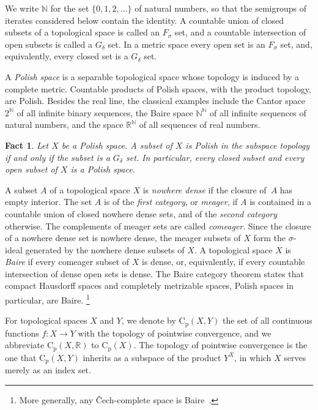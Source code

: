 \documentclass[psamsfonts]{amsart}
\newtheorem{fact}[thm]{Fact}
\theoremstyle{definition}
\theoremstyle{remark}
\newcommand{\Cp}{\mathrm{C}_{\mathrm{p}}}
\numberwithin{equation}{section}
\begin{document}
We write $\mathbb{N}$ for the set $\{0,1,2,\dots\}$ of natural numbers, so that the semigroups of iterates considered below contain the identity.
A countable union of closed subsets of a topological space is called an $F_\sigma$ set, and a countable intersection of open subsets is called a $G_\delta$ set.
In a metric space every open set is an $F_\sigma$ set, and, equivalently, every closed set is a $G_\delta$ set.

A \emph{Polish space} is a separable topological space whose topology is induced by a complete metric.
Countable products of Polish spaces, with the product topology, are Polish.
Besides the real line, the classical examples include the Cantor space~$2^\mathbb{N}$ of all infinite binary sequences, the Baire space $\mathbb{N}^\mathbb{N}$ of all infinite sequences of natural numbers, and the space $\mathbb{R}^\mathbb{N}$ of all sequences of real numbers.

\begin{fact}\cite[4.3.24]{Engelking:1989}
  Let $X$ be a Polish space.
  A subset of $X$ is Polish in the subspace topology if and only if the subset is a $G_\delta$ set.
  In particular, every closed subset and every open subset of $X$ is a Polish space.
\end{fact}

A subset $A$ of a topological space $X$ is \emph{nowhere dense} if the closure of~$A$ has empty interior.
The set $A$ is of the \emph{first category}, or \emph{meager}, if $A$ is contained in a countable union of closed nowhere dense sets, and of the \emph{second category} otherwise.
The complements of meager sets are called \emph{comeager}.
Since the closure of a nowhere dense set is nowhere dense, the meager subsets of $X$ form the $\sigma$-ideal generated by the nowhere dense subsets of $X$.
A topological space $X$ is \emph{Baire} if every comeager subset of $X$ is dense, or, equivalently, if every countable intersection of dense open sets is dense.
The Baire category theorem states that compact Hausdorff spaces and completely metrizable spaces, Polish spaces in particular, are Baire.%
\footnote{More generally, any Čech-complete space is Baire~\cite[Theorem 3.9.3]{Engelking:1989}.}

For topological spaces $X$ and $Y$, we denote by $\Cp(X,Y)$ the set of all continuous functions $f\colon X\to Y$ with the topology of pointwise convergence, and we abbreviate $\Cp(X,\mathbb{R})$ to $\Cp(X)$.
The topology of pointwise convergence is the one that $\Cp(X,Y)$ inherits as a subspace of the product $Y^X$, in which $X$ serves merely as an index set.
\end{document}
